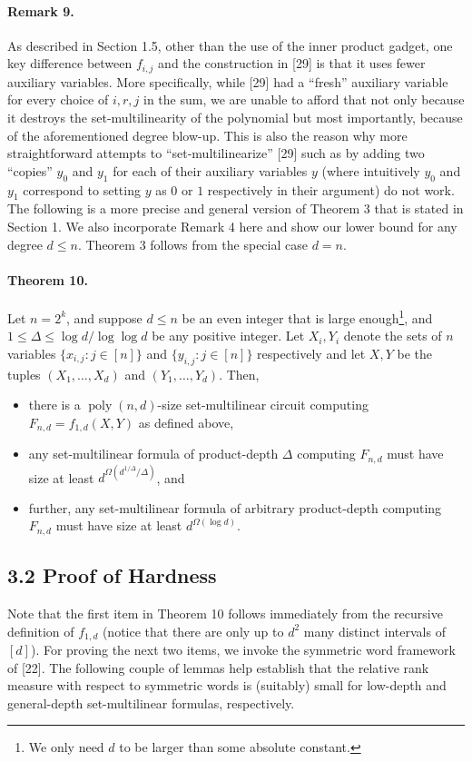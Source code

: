 \documentclass[10pt,a4paper]{article}
\begin{document}
\paragraph{Remark 9.} As described in Section 1.5, other than the use of the inner product gadget, one key difference between $f_{i,j}$ and the construction in [29] is that it uses fewer auxiliary variables. More specifically, while [29] had a ``fresh'' auxiliary variable for every choice of $i,r,j$ in the sum, we are unable to afford that not only because it destroys the set-multilinearity of the polynomial but most importantly, because of the aforementioned degree blow-up. This is also the reason why more straightforward attempts to ``set-multilinearize'' [29] such as by adding two ``copies'' $y_0$ and $y_1$ for each of their auxiliary variables $y$ (where intuitively $y_0$ and $y_1$ correspond to setting $y$ as $0$ or $1$ respectively in their argument) do not work.
The following is a more precise and general version of Theorem 3 that is stated in Section 1. We also incorporate Remark 4 here and show our lower bound for any degree $d\leq n$. Theorem 3 follows from the special case $d=n$.
\paragraph{Theorem 10.} Let $n=2^k$, and suppose $d\leq n$ be an even integer that is large enough\footnote{We only need $d$ to be larger than some absolute constant.}, and $1\leq\Delta\leq\log d/\log\log d$ be any positive integer. Let $X_i,Y_i$ denote the sets of $n$ variables $\{x_{i,j}:j\in[n]\}$ and $\{y_{i,j}:j\in[n]\}$ respectively and let $X,Y$ be the tuples $(X_1,\ldots,X_d)$ and $(Y_1,\ldots,Y_d)$. Then,
\begin{itemize}
\item there is a $\operatorname{poly}(n,d)$-size set-multilinear circuit computing $F_{n,d}=f_{1,d}(X,Y)$ as defined above,
\item any set-multilinear formula of product-depth $\Delta$ computing $F_{n,d}$ must have size at least $d^{\Omega(d^{1/\Delta}/\Delta)}$, and
\item further, any set-multilinear formula of arbitrary product-depth computing $F_{n,d}$ must have size at least $d^{\Omega(\log d)}$.
\end{itemize}
\subsection*{3.2 Proof of Hardness}
Note that the first item in Theorem 10 follows immediately from the recursive definition of $f_{1,d}$ (notice that there are only up to $d^2$ many distinct intervals of $[d]$). For proving the next two items, we invoke the symmetric word framework of [22]. The following couple of lemmas help establish that the relative rank measure with respect to symmetric words is (suitably) small for low-depth and general-depth set-multilinear formulas, respectively.
\end{document}
